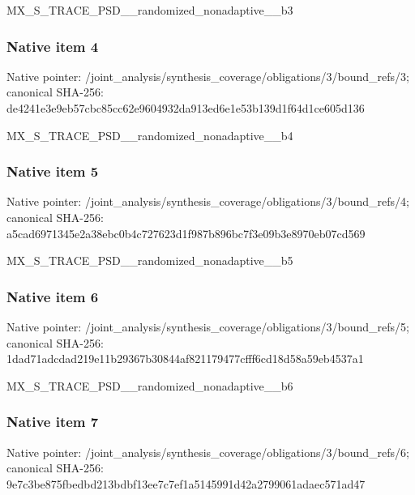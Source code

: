 \documentclass[10pt,a4paper]{article}
\begin{document}
\begingroup\raggedright\sloppy MX\_\allowbreak{}S\_\allowbreak{}TRACE\_\allowbreak{}PSD\_\allowbreak{}\_\allowbreak{}randomized\_\allowbreak{}nonadaptive\_\allowbreak{}\_\allowbreak{}b3\par\endgroup

\subsubsection{Native item 4}
Native pointer: /joint\_\allowbreak{}analysis/synthesis\_\allowbreak{}coverage/obligations/3/bound\_\allowbreak{}refs/3; canonical SHA-256: de4241e3e9eb57cbc85cc62e9604932da913ed6e1e53b139d1f64d1ce605d136

\begingroup\raggedright\sloppy MX\_\allowbreak{}S\_\allowbreak{}TRACE\_\allowbreak{}PSD\_\allowbreak{}\_\allowbreak{}randomized\_\allowbreak{}nonadaptive\_\allowbreak{}\_\allowbreak{}b4\par\endgroup

\subsubsection{Native item 5}
Native pointer: /joint\_\allowbreak{}analysis/synthesis\_\allowbreak{}coverage/obligations/3/bound\_\allowbreak{}refs/4; canonical SHA-256: a5cad6971345e2a38ebc0b4c727623d1f987b896bc7f3e09b3e8970eb07cd569

\begingroup\raggedright\sloppy MX\_\allowbreak{}S\_\allowbreak{}TRACE\_\allowbreak{}PSD\_\allowbreak{}\_\allowbreak{}randomized\_\allowbreak{}nonadaptive\_\allowbreak{}\_\allowbreak{}b5\par\endgroup

\subsubsection{Native item 6}
Native pointer: /joint\_\allowbreak{}analysis/synthesis\_\allowbreak{}coverage/obligations/3/bound\_\allowbreak{}refs/5; canonical SHA-256: 1dad71adcdad219e11b29367b30844af821179477cfff6cd18d58a59eb4537a1

\begingroup\raggedright\sloppy MX\_\allowbreak{}S\_\allowbreak{}TRACE\_\allowbreak{}PSD\_\allowbreak{}\_\allowbreak{}randomized\_\allowbreak{}nonadaptive\_\allowbreak{}\_\allowbreak{}b6\par\endgroup

\subsubsection{Native item 7}
Native pointer: /joint\_\allowbreak{}analysis/synthesis\_\allowbreak{}coverage/obligations/3/bound\_\allowbreak{}refs/6; canonical SHA-256: 9e7c3be875fbedbd213bdbf13ee7c7ef1a5145991d42a2799061adaec571ad47
\end{document}
